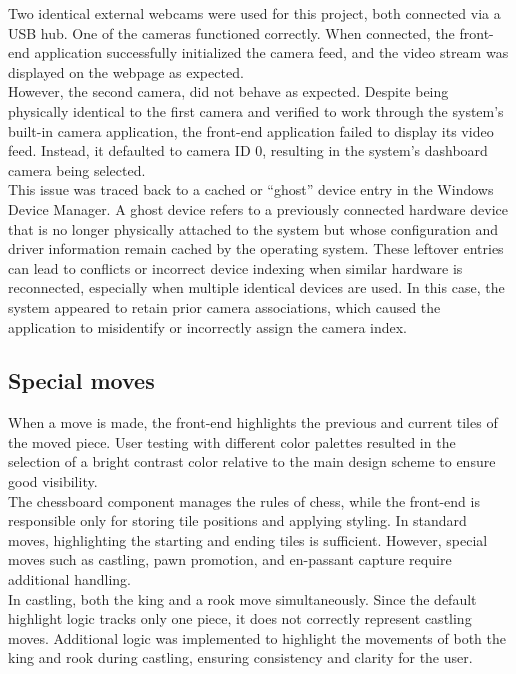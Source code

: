 Two identical external webcams were used for this project, both connected via a USB hub. One of the cameras functioned correctly. When connected, the front-end application successfully initialized the camera feed, and the video stream was displayed on the webpage as expected.\\

However, the second camera, did not behave as expected. Despite being physically identical to the first camera and verified to work through the system's built-in camera application, the front-end application failed to display its video feed. Instead, it defaulted to camera ID 0, resulting in the system's dashboard camera being selected.\\

This issue was traced back to a cached or “ghost” device entry in the Windows Device Manager. A ghost device refers to a previously connected hardware device that is no longer physically attached to the system but whose configuration and driver information remain cached by the operating system. These leftover entries can lead to conflicts or incorrect device indexing when similar hardware is reconnected, especially when multiple identical devices are used. In this case, the system appeared to retain prior camera associations, which caused the application to misidentify or incorrectly assign the camera index.

\subsection{Special moves}
When a move is made, the front-end highlights the previous and current tiles of the moved piece. User testing with different color palettes resulted in the selection of a bright contrast color relative to the main design scheme to ensure good visibility. \\

The chessboard component manages the rules of chess, while the front-end is responsible only for storing tile positions and applying styling. In standard moves, highlighting the starting and ending tiles is sufficient. However, special moves such as \gls{castling}, pawn \gls{promotion}, and \gls{en-passant} capture require additional handling. \\

In \gls{castling}, both the king and a rook move simultaneously. Since the default highlight logic tracks only one piece, it does not correctly represent \gls{castling} moves. Additional logic was implemented to highlight the movements of both the king and rook during \gls{castling}, ensuring consistency and clarity for the user.



